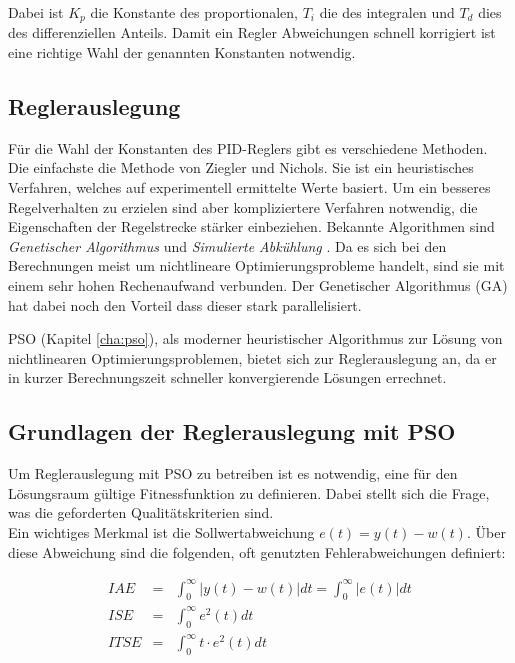 Dabei ist $K_p$ die Konstante des proportionalen, $T_i$ die des integralen und
$T_d$ dies des differenziellen Anteils. Damit ein Regler Abweichungen schnell
korrigiert ist eine richtige Wahl der genannten Konstanten notwendig.

\subsection{Reglerauslegung}

F\"ur die Wahl der Konstanten des PID-Reglers gibt es verschiedene Methoden. Die
einfachste die Methode von Ziegler und Nichols. Sie ist ein heuristisches
Verfahren, welches auf experimentell ermittelte Werte basiert. Um ein besseres
Regelverhalten zu erzielen sind aber kompliziertere Verfahren notwendig, die
Eigenschaften der Regelstrecke st\"arker einbeziehen. Bekannte Algorithmen sind
\textit{Genetischer Algorithmus} und \textit{Simulierte Abk\"uhlung}
\parencite{bib:pso_pid_gaing}. Da es sich bei den Berechnungen meist um
nichtlineare Optimierungsprobleme handelt, sind sie mit einem sehr hohen
Rechenaufwand verbunden. Der Genetischer Algorithmus (GA) hat dabei noch den
Vorteil dass dieser stark parallelisiert. 

PSO (Kapitel \ref{cha:pso}), als moderner heuristischer Algorithmus zur L\"osung
von nichtlinearen Optimierungsproblemen, bietet sich zur Reglerauslegung an, da
er in kurzer Berechnungszeit schneller konvergierende L\"osungen errechnet.

\subsection{Grundlagen der Reglerauslegung mit PSO}

Um Reglerauslegung mit PSO zu betreiben ist es notwendig, eine f\"ur den
L\"osungsraum g\"ultige Fitnessfunktion zu definieren. Dabei stellt sich die
Frage, was die geforderten Qualit\"atskriterien sind.\\ Ein wichtiges Merkmal
ist die Sollwertabweichung $e(t)=y(t)-w(t)$. \"Uber diese Abweichung sind die
folgenden, oft genutzten Fehlerabweichungen definiert:

\begin{eqnarray}
    IAE&=&\int^{\infty}_0\lvert y(t)-w(t)\rvert dt=\int^{\infty}_0\lvert e(t)\rvert dt \label{eq:IAE} \\
    ISE&=&\int^{\infty}_0 e^2(t) dt \label{eq:ISE} \\
    ITSE&=&\int^{\infty}_0 t\cdot e^2(t) dt \label{eq:ITSE}
\end{eqnarray}

